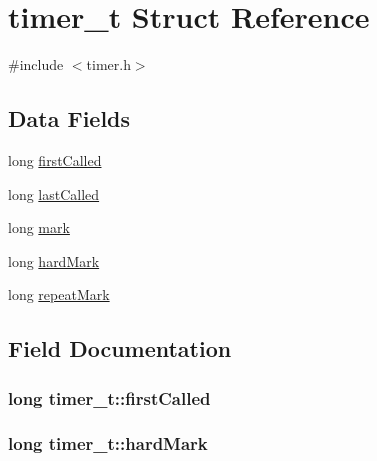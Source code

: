 \hypertarget{structtimer__t}{}\section{timer\+\_\+t Struct Reference}
\label{structtimer__t}


{\ttfamily \#include $<$timer.\+h$>$}

\subsection*{Data Fields}
\begin{DoxyCompactItemize}
\item 
long \hyperlink{structtimer__t_a2374b7b9d63d77111d9973252ba1b03b}{first\+Called}
\item 
long \hyperlink{structtimer__t_aed72c4a4e2feff9b5f6abfcea6d7cc8f}{last\+Called}
\item 
long \hyperlink{structtimer__t_a66d411aa2e553ff8194a1101cc3d7e6e}{mark}
\item 
long \hyperlink{structtimer__t_aabb3afbf051df8dc03411e051716fa8c}{hard\+Mark}
\item 
long \hyperlink{structtimer__t_a211b11f8aa184adec6a21c1ec46d2526}{repeat\+Mark}
\end{DoxyCompactItemize}


\subsection{Field Documentation}
\subsubsection[{\texorpdfstring{first\+Called}{firstCalled}}]{\setlength{\rightskip}{0pt plus 5cm}long timer\+\_\+t\+::first\+Called}\hypertarget{structtimer__t_a2374b7b9d63d77111d9973252ba1b03b}{}\label{structtimer__t_a2374b7b9d63d77111d9973252ba1b03b}
\subsubsection[{\texorpdfstring{hard\+Mark}{hardMark}}]{\setlength{\rightskip}{0pt plus 5cm}long timer\+\_\+t\+::hard\+Mark}\hypertarget{structtimer__t_aabb3afbf051df8dc03411e051716fa8c}{}\label{structtimer__t_aabb3afbf051df8dc03411e051716fa8c}
